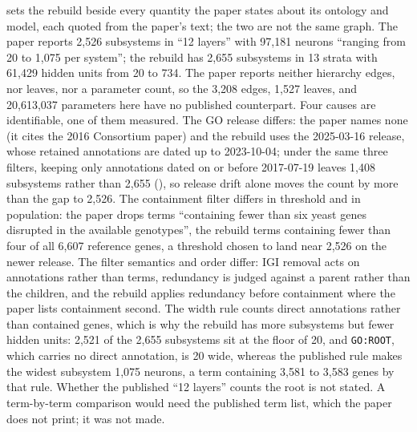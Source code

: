   sets the rebuild
beside every quantity the paper states about its ontology and model, each quoted from the
paper's text; the two are not the same graph. The paper reports 2,526 subsystems in ``12
layers'' with 97,181 neurons ``ranging from 20 to 1,075 per system''; the rebuild has 2,655
subsystems in 13 strata with 61,429 hidden units from 20 to 734. The paper reports neither
hierarchy edges, nor leaves, nor a parameter count, so the 3,208 edges, 1,527 leaves, and
20,613,037 parameters here have no published counterpart. Four causes are identifiable, one
of them measured. The GO release differs: the paper names none (it cites the 2016 Consortium
paper) and the rebuild uses the 2025-03-16 release, whose retained annotations are dated up
to 2023-10-04; under the same three filters, keeping only annotations dated on or before
2017-07-19 leaves 1,408 subsystems rather than 2,655 (), so
release drift alone moves the count by more than the gap to 2,526. The containment filter
differs in threshold and in population: the paper drops terms ``containing fewer than six
yeast genes disrupted in the available genotypes'', the rebuild terms containing fewer than
four of all 6,607 reference genes, a threshold chosen to land near 2,526 on the newer
release. The filter semantics and order differ: IGI removal acts on annotations rather than
terms, redundancy is judged against a parent rather than the children, and the rebuild
applies redundancy before containment where the paper lists containment second. The width
rule counts direct annotations rather than contained genes, which is why the rebuild has
more subsystems but fewer hidden units: 2,521 of the 2,655 subsystems sit at the floor of
20, and \texttt{GO:ROOT}, which carries no direct annotation, is 20 wide, whereas the
published rule makes the widest subsystem 1,075 neurons, a term containing 3,581 to 3,583
genes by that rule. Whether the published ``12 layers'' counts the root is not stated. A
term-by-term comparison would need the published term list, which the paper does not
print; it was not made.

